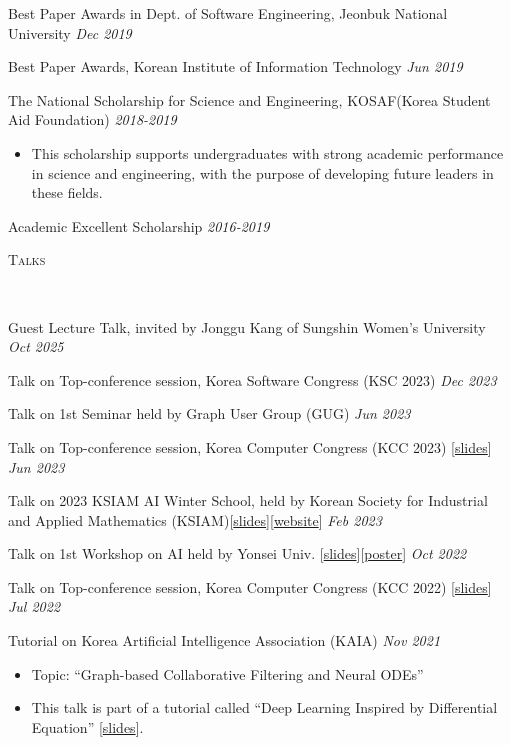 \documentclass[10pt]{article}
\newenvironment{changemargin}[2]{
  \begin{list}{}{
    \setlength{\topsep}{0pt}
    \setlength{\leftmargin}{#1}
    \setlength{\rightmargin}{#2}
    \setlength{\listparindent}{\parindent}
    \setlength{\itemindent}{\parindent}
    \setlength{\parsep}{\parskip}
  }
  \item[]}{\end{list}
}
\newcommand{\lineover}{
	\begin{changemargin}{-0.05in}{-0.05in}
		\vspace*{-8pt}
		\hrulefill \\
		\vspace*{-2pt}
	\end{changemargin}
}
\newcommand{\header}[1]{
	\begin{changemargin}{-0.5in}{-0.5in}
		\scshape{#1}\\
  	\lineover
	\end{changemargin}
}
\newcommand{\award}[2]{
	{#1} \hfill \emph{#2}\\ \medskip
}
\newenvironment{body} {
	\vspace*{-16pt}
	\begin{changemargin}{-0.25in}{-0.5in}
  }
	{\end{changemargin}
}
\begin{document}
\begin{body}
\award{Best Paper Awards in Dept. of Software Engineering, Jeonbuk National University}{Dec 2019}
\award{Best Paper Awards, Korean Institute of Information Technology}{Jun 2019}
\award{The National Scholarship for Science and Engineering, KOSAF(Korea Student Aid Foundation)}{2018-2019}
    \begin{itemize} \itemsep -0pt  %
      \item This scholarship supports undergraduates with strong academic performance in science and engineering, with the purpose of developing future leaders in these fields.
  	\end{itemize}
\award{Academic Excellent Scholarship}{2016-2019}
\end{body}

\medskip
\header{Talks}

\begin{body}
	\vspace{14pt}
\award{Guest Lecture Talk, invited by Jonggu Kang of Sungshin Women’s University} {Oct 2025}
\award{Talk on Top-conference session, Korea Software Congress (KSC 2023)} {Dec 2023}
\award{Talk on 1st Seminar held by Graph User Group (GUG)}{Jun 2023}
\award{Talk on Top-conference session, Korea Computer Congress (KCC 2023) [\href{https://www.dropbox.com/s/34h6pmr7ftdiuzr/BSPM-KCC23.pptx?dl=0}{slides}]}{Jun 2023}
\award{Talk on 2023 KSIAM AI Winter School, held by Korean Society for Industrial and Applied Mathematics (KSIAM)[\href{https://www.dropbox.com/s/p4sd5h40hcuxcob/KSIAM23-Tutorial-ODE-RecSys.pdf?dl=0}{slides}][\href{https://ksiam.org/Conference/ConferenceView.asp?AC=3&CODE=CD20230101&CpPage=\#CONF}{website}]}{Feb 2023}
\award{Talk on 1st Workshop on AI held by Yonsei Univ. [\href{https://www.dropbox.com/s/9au5xx13qa2l529/AAAI22_workshop.pdf?dl=0}{slides}][\href{https://www.dropbox.com/s/pibzd51d76zy907/AAAI22-Yonsei_AI_Workshop.pdf?dl=0}{poster}]}{Oct 2022}
\award{Talk on Top-conference session, Korea Computer Congress (KCC 2022) [\href{https://www.dropbox.com/s/22d9d92ns8uv9qw/AAAI22_KCC22.pdf?dl=0}{slides}]}{Jul 2022}
\award{Tutorial on Korea Artificial Intelligence Association (KAIA)}{Nov 2021}
	\begin{itemize} \itemsep -0pt  %
        \item Topic: ``Graph-based Collaborative Filtering and Neural ODEs''
		\item This talk is part of a tutorial called ``Deep Learning Inspired by Differential Equation'' [\href{https://www.dropbox.com/s/1xn8xhd6llmhblz/%5BKAIA2021%5DTutorial-LT-OCF.pdf?dl=0}{slides}].
  	\end{itemize}
\end{body}
\end{document}
